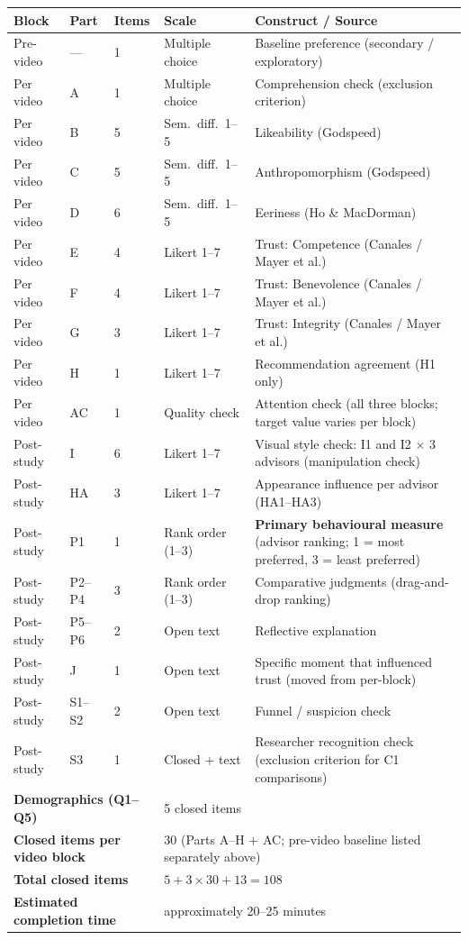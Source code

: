 \documentclass[11pt, a4paper]{article}
\begin{document}
\begin{longtable}{@{}llllp{4.2cm}@{}}
\toprule
\textbf{Block} & \textbf{Part} & \textbf{Items} & \textbf{Scale} & \textbf{Construct / Source} \\
\midrule
\endhead
Pre-video & — & 1 & Multiple choice & Baseline preference (secondary / exploratory) \\
Per video & A & 1 & Multiple choice & Comprehension check (exclusion criterion) \\
Per video & B & 5 & Sem.~diff.~1--5 & Likeability (Godspeed) \\
Per video & C & 5 & Sem.~diff.~1--5 & Anthropomorphism (Godspeed) \\
Per video & D & 6 & Sem.~diff.~1--5 & Eeriness (Ho \& MacDorman) \\
Per video & E & 4 & Likert 1--7 & Trust: Competence (Canales / Mayer et al.) \\
Per video & F & 4 & Likert 1--7 & Trust: Benevolence (Canales / Mayer et al.) \\
Per video & G & 3 & Likert 1--7 & Trust: Integrity (Canales / Mayer et al.) \\
Per video & H & 1 & Likert 1--7 & Recommendation agreement (H1 only) \\
Per video & AC & 1 & Quality check & Attention check (all three blocks; target value varies per block) \\
\midrule
Post-study & I & 6 & Likert 1--7 & Visual style check: I1 and I2 $\times$ 3 advisors (manipulation check) \\
Post-study & HA & 3 & Likert 1--7 & Appearance influence per advisor (HA1--HA3) \\
Post-study & P1 & 1 & Rank order (1--3) & \textbf{Primary behavioural measure} (advisor ranking; 1 = most preferred, 3 = least preferred) \\
Post-study & P2--P4 & 3 & Rank order (1--3) & Comparative judgments (drag-and-drop ranking) \\
Post-study & P5--P6 & 2 & Open text & Reflective explanation \\
Post-study & J & 1 & Open text & Specific moment that influenced trust (moved from per-block) \\
Post-study & S1--S2 & 2 & Open text & Funnel / suspicion check \\
Post-study & S3 & 1 & Closed + text & Researcher recognition check (exclusion criterion for C1 comparisons) \\
\midrule
\multicolumn{3}{l}{\textbf{Demographics (Q1--Q5)}} & \multicolumn{2}{l}{5 closed items} \\
\multicolumn{3}{l}{\textbf{Closed items per video block}} & \multicolumn{2}{l}{30 (Parts A--H + AC; pre-video baseline listed separately above)} \\
\multicolumn{3}{l}{\textbf{Total closed items}} & \multicolumn{2}{l}{$5 + 3 \times 30 + 13 = 108$} \\
\multicolumn{3}{l}{\textbf{Estimated completion time}} & \multicolumn{2}{l}{approximately 20--25 minutes} \\
\bottomrule
\end{longtable}
\end{document}
